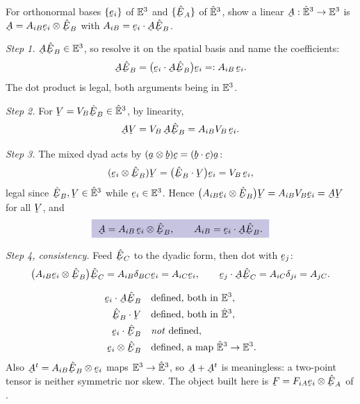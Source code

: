 \begin{problem}
For orthonormal bases $\{\be_i\}$ of $\mathbb{E}^{3}$ and $\{\hbE_A\}$ of $\hat{\mathbb{E}}^{3}$,
show a linear $\bA:\hEt\to\Et$ is $\bA=A_{iB}\be_i\otimes\hbE_B$ with
$A_{iB}=\ip{\be_i}{\bA\hbE_B}$.
\end{problem}
\begin{solution}
\emph{Step 1.} $\bA\hbE_B\in\Et$, so resolve it on the spatial basis and
name the coefficients:
\[
   \bA\hbE_B=\big(\ip{\be_i}{\bA\hbE_B}\big)\be_i=:A_{iB}\,\be_i .
\]
The dot product is legal, both arguments being in $\mathbb{E}^{3}$.

\emph{Step 2.} For $\bV=V_B\hbE_B\in\hEt$, by linearity,
\[
   \bA\bV=V_B\,\bA\hbE_B=A_{iB}V_B\,\be_i .
\]

\emph{Step 3.} The mixed dyad acts by $(\ba\otimes\bb)\bc=(\ip\bb\bc)\ba$:
\[
   (\be_i\otimes\hbE_B)\bV=\big(\ip{\hbE_B}{\bV}\big)\be_i=V_B\,\be_i ,
\]
legal since $\hbE_B,\bV\in\hEt$ while $\be_i\in\Et$. Hence
$\big(A_{iB}\be_i\otimes\hbE_B\big)\bV=A_{iB}V_B\be_i=\bA\bV$ for all
$\bV$, and
\[
   \boxed{\ \bA=A_{iB}\,\be_i\otimes\hbE_B,\qquad
   A_{iB}=\ip{\be_i}{\bA\hbE_B}.\ }
\]

\emph{Step 4, consistency.} Feed $\hbE_C$ to the dyadic form, then dot
with $\be_j$:
\[
   \big(A_{iB}\be_i\otimes\hbE_B\big)\hbE_C=A_{iB}\dd_{BC}\be_i
   =A_{iC}\be_i,
   \qquad
   \ip{\be_j}{\bA\hbE_C}=A_{iC}\dd_{ji}=A_{jC}.
\]
\end{solution}

\begin{remark}\label{rem:twopointlegal}
\[
\begin{aligned}
   \ip{\be_i}{\bA\hbE_B}&\quad\text{defined, both in }\Et,\\
   \ip{\hbE_B}{\bV}&\quad\text{defined, both in }\hEt,\\
   \ip{\be_i}{\hbE_B}&\quad\text{\emph{not} defined},\\
   \be_i\otimes\hbE_B&\quad\text{defined, a map }\hEt\to\Et .
\end{aligned}
\]
Also $\bA^{t}=A_{iB}\hbE_B\otimes\be_i$ maps $\mathbb{E}^{3}\to\hat{\mathbb{E}}^{3}$, so
$\bA+\bA^{t}$ is meaningless: a two-point tensor is neither symmetric nor
skew. The object built here is $\bF=F_{iA}\be_i\otimes\hbE_A$ of .
\end{remark}

